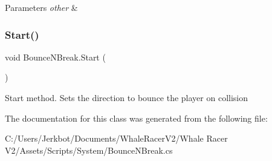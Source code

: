 \begin{DoxyParams}{Parameters}
{\em other} & \\
\hline
\end{DoxyParams}
\mbox{\label{class_bounce_n_break_ab96786800939a3b8e2f6875e9dc5e9e3}} 
\subsubsection{\texorpdfstring{Start()}{Start()}}
{\footnotesize\ttfamily void Bounce\+N\+Break.\+Start (\begin{DoxyParamCaption}{ }\end{DoxyParamCaption})\hspace{0.3cm}{\ttfamily [private]}}



Start method. Sets the direction to bounce the player on collision 



The documentation for this class was generated from the following file\+:\begin{DoxyCompactItemize}
\item 
C\+:/\+Users/\+Jerkbot/\+Documents/\+Whale\+Racer\+V2/\+Whale Racer V2/\+Assets/\+Scripts/\+System/Bounce\+N\+Break.\+cs\end{DoxyCompactItemize}
